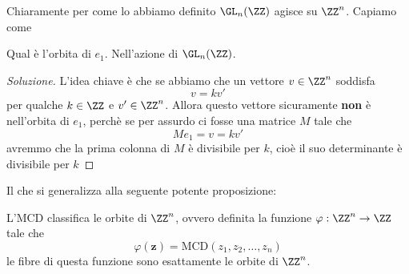 \documentclass[11pt]{scrartcl}
\begin{document}
	Chiaramente per come lo abbiamo definito $\GL_n(\ZZ)$ agisce su $\ZZ^n$. Capiamo come
	\begin{example}
		Qual è l'orbita di $e_1$. Nell'azione di $\GL_n(\ZZ)$.
	\end{example}
	\begin{proof}[Soluzione]
		L'idea chiave è che se abbiamo che un vettore $v\in\ZZ^n$ soddisfa 
		$$v=kv'$$
		per qualche $k\in \ZZ $ e $v'\in\ZZ^n$. Allora questo vettore sicuramente \textbf{non} è nell'orbita di $e_1$, perchè se per assurdo ci fosse una matrice $M$ tale che
		$$Me_1=v=kv'$$
		avremmo che la prima colonna di $M$ è divisibile per $k$, cioè il suo determinante è divisibile per $k$
	\end{proof}
	Il che si generalizza alla seguente potente proposizione:
	\begin{proposition}[Orbite di $\ZZ^n$]
		L'MCD classifica le orbite di $\ZZ^n$, ovvero definita la funzione $\varphi:\ZZ^n\to\ZZ$ tale che
		$$\varphi(\mathbf{z})=\text{MCD}\left(z_1,z_2,\dots,z_n\right)$$
		le fibre di questa funzione sono esattamente le orbite di $\ZZ^n$.
	\end{proposition}
\end{document}
